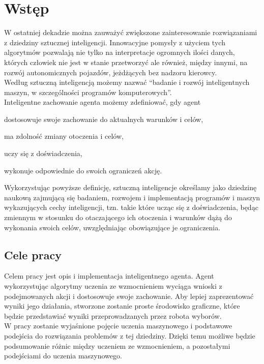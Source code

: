\chapter{Wstęp}
\label{cha:wstep}

W ostatniej dekadzie można zauważyć zwiększone zainteresowanie rozwiązaniami z dziedziny
sztucznej inteligencji. Innowacyjne pomysły z użyciem tych algorytmów pozwalają nie tylko na interpretacje ogromnych 
ilości danych, których człowiek nie jest w stanie przetworzyć ale również, między innymi, na rozwój 
autonomicznych pojazdów, jeżdżących bez nadzoru kierowcy.\\
Według \cite{mccarthy2007artificial} sztuczną inteligencją możemy nazwać ``badanie i rozwój inteligentnych maszyn, 
w szczególności programów komputerowych''.\\
Inteligentne zachowanie agenta możemy zdefiniować, gdy agent\cite{L.:2010:AIF:1809744}
\begin{itemize*}
 \item dostosowuje swoje zachowanie do aktualnych warunków i celów,
 \item ma zdolność zmiany otoczenia i celów,
 \item uczy się z doświadczenia,
 \item wykonuje odpowiednie do swoich ograniczeń akcję.
\end{itemize*}
Wykorzystując powyższe definicję, sztuczną inteligencje określamy jako dziedzinę naukową zajmującą się badaniem, 
rozwojem i implementacją programów i maszyn wykazujących cechy inteligencji, tzn. takie które ucząc się z 
doświadczenia, będąc zmiennym w stosunku do otaczającego ich otoczenia i warunków dążą do wykonania swoich celów,
uwzględniając obowiązujące je ograniczenia. 

\section{Cele pracy}
\label{sec:celePracy}

Celem pracy jest opis i implementacja inteligentnego agenta. Agent wykorzystując algorytmy uczenia ze wzmocnieniem 
wyciąga wnioski z podejmowanych akcji i dostosowuje swoje zachowanie. Aby lepiej zaprezentować wyniki jego działania,
stworzone zostanie proste środowisko graficzne, które będzie przedstawiać wyniki przeprowadzanych przez robota wyborów.
\\
W pracy zostanie wyjaśnione pojęcie uczenia maszynowego i podstawowe podejścia do rozwiązania problemów z tej dziedziny.
Dzięki temu możliwe będzie podsumowanie różnic między uczeniem ze wzmocnieniem, a pozostałymi podejściami do uczenia 
maszynowego.


